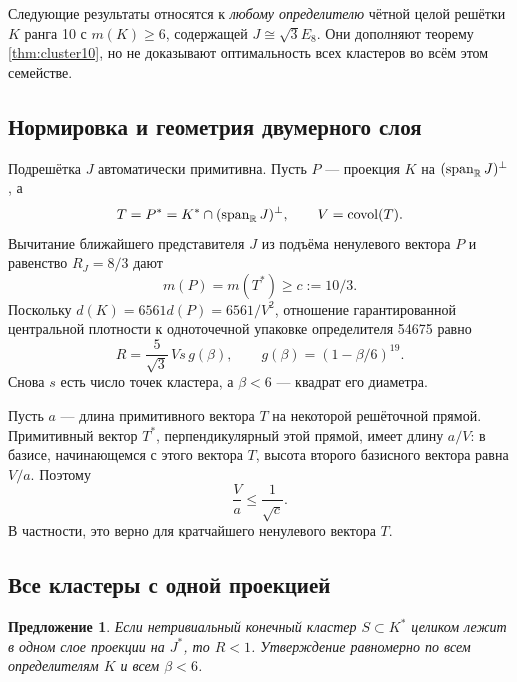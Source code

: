 \documentclass[11pt,a4paper]{article}
\newtheorem{proposition}[theorem]{Предложение}
\theoremstyle{remark}\newtheorem{remark}[theorem]{Замечание}
\newcommand{\spanR}{\operatorname{span}_{\R}}\newcommand{\diag}{\operatorname{diag}}
\begin{document}
Следующие результаты относятся к \emph{любому определителю} чётной целой решётки $K$ ранга 10 с $m(K)\ge6$, содержащей $J\cong\sqrt3E_8$. Они дополняют теорему \ref{thm:cluster10}, но не доказывают оптимальность всех кластеров во всём этом семействе.

\subsection{Нормировка и геометрия двумерного слоя}

Подрешётка $J$ автоматически примитивна. Пусть $P$ --- проекция $K$ на $(\spanR J)^\perp$, а
\[
T=P^*=K^*\cap(\spanR J)^\perp,\qquad V=\operatorname{covol}(T).
\]
Вычитание ближайшего представителя $J$ из подъёма ненулевого вектора $P$ и равенство $R_J=8/3$ дают
\[
m(P)=m(T^*)\ge c:=10/3.
\]
Поскольку $d(K)=6561d(P)=6561/V^2$, отношение гарантированной центральной плотности к одноточечной упаковке определителя 54675 равно
\begin{equation}\label{eq:uniform10ratio}
R=\frac5{\sqrt3}\,V s\,g(\beta),\qquad
g(\beta)=(1-\beta/6)^{19}.
\end{equation}
Снова $s$ есть число точек кластера, а $\beta<6$ --- квадрат его диаметра.

Пусть $a$ --- длина примитивного вектора $T$ на некоторой решёточной прямой. Примитивный вектор $T^*$, перпендикулярный этой прямой, имеет длину $a/V$: в базисе, начинающемся с этого вектора $T$, высота второго базисного вектора равна $V/a$. Поэтому
\begin{equation}\label{eq:planarspacing}
\frac Va\le\frac1{\sqrt c}.
\end{equation}
В частности, это верно для кратчайшего ненулевого вектора $T$.

\subsection{Все кластеры с одной проекцией}

\begin{proposition}\label{prop:onefiber10}
Если нетривиальный конечный кластер $S\subset K^*$ целиком лежит в одном слое проекции на $J^*$, то $R<1$. Утверждение равномерно по всем определителям $K$ и всем $\beta<6$.
\end{proposition}
\end{document}
